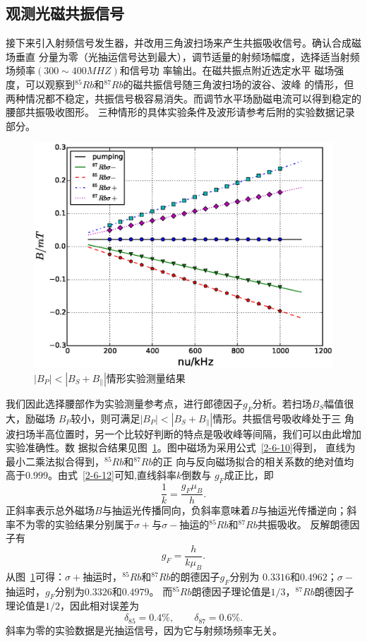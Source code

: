 \documentclass[11pt,a4paper]{article}
\begin{document}
\begin{spacing}{1.3}
\begin{CJK*}{UTF8}{gbsn}
\subsection{观测光磁共振信号}
接下来引入射频信号发生器，并改用三角波扫场来产生共振吸收信号。确认合成磁场垂直
分量为零（光抽运信号达到最大），调节适量的射频场幅度，选择适当射频场频率$(300\sim 400MHZ)$和信号功
率输出。在磁共振点附近选定水平
磁场强度，可以观察到$^{85}Rb$和$^{87}Rb$的磁共振信号随三角波扫场的波谷、波峰
的情形，但两种情况都不稳定，共振信号极容易消失。而调节水平场励磁电流可以得到稳定的腰部共振吸收图形。
三种情形的具体实验条件及波形请参考后附的实验数据记录部分。\par 
\begin{figure}[ht]
\centering
\includegraphics[width=.8\textwidth]{1112a}
\caption{$|B_P|<|B_S+B_{\parallel}|$情形实验测量结果}
\label{fig:gf}
\end{figure}
我们因此选择腰部作为实验测量参考点，进行郎德因子$g_F$分析。若扫场$B_S$幅值很大，励磁场
$B_P$较小，则可满足$|B_P|<|B_S+B_{\parallel}|$情形。共振信号吸收峰处于三
角波扫场半高位置时，另一个比较好判断的特点是吸收峰等间隔，我们可以由此增加实验准确性。数
据拟合结果见图~\ref{fig:gf}。图中磁场为采用公式~\eqref{2-6-10}得到，
直线为最小二乘法拟合得到，$^{85}Rb$和$^{87}Rb$的正
向与反向磁场拟合的相关系数的绝对值均高于$0.999$。由式~\eqref{2-6-12}可知,直线斜率$k$倒数与
$g_F$成正比，即
\begin{equation}
\frac{1}{k} = \frac{g_F\mu_B}{h}.
\end{equation}
正斜率表示总外磁场$B$与抽运光传播同向，负斜率意味着$B$与抽运光传播逆向；斜
率不为零的实验结果分别属于$\sigma +$与$\sigma -$抽运的$^{85}Rb$和$^{87}Rb$共振吸收。
反解朗德因子有
\begin{equation}
g_F = \frac{h}{k \mu_B}.
\end{equation}
从图~\ref{fig:gf}可得：$\sigma +$抽运时，$^{85}Rb$和$^{87}Rb$的朗德因子$g_F$分别为
$0.3316$和$0.4962$；$\sigma -$抽运时，$g_F$分别为$0.3326$和$0.4979$。
而$^{85}Rb$朗德因子理论值是$1/3$，$^{87}Rb$朗德因子理论值是$1/2$，因此相对误差为
\begin{equation}
\delta_{85} = 0.4\%,\qquad \delta_{87} = 0.6\%.
\end{equation}
斜率为零的实验数据是光抽运信号，因为它与射频场频率无关。



\end{CJK*}
\end{spacing}
\end{document}
